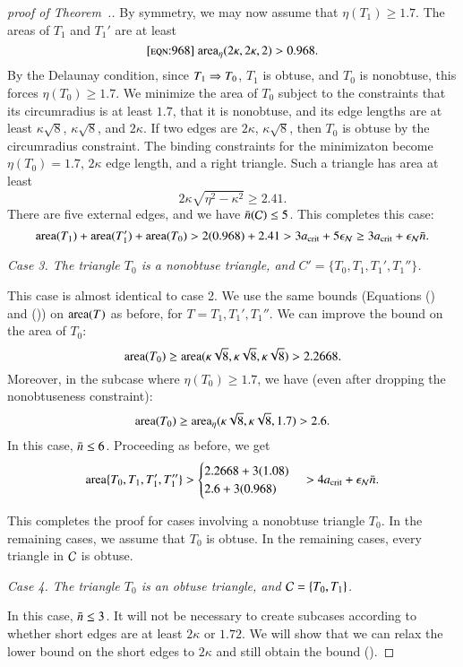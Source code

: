 \begin{proof}[proof of Theorem~.]
By symmetry, we may now assume that $\eta(T_1) \ge 1.7$.  
The areas of $T_1$ and $T_1'$ are at least
\begin{equation}\libel{eqn:968}
\areta(2\kappa,2\kappa,2) > 0.968.
\end{equation}
By the
Delaunay condition, since $T_1\Rightarrow T_0$, $T_1$ is obtuse, and $T_0$ is
nonobtuse, this forces $\eta(T_0)\ge 1.7$.  We minimize the area of
$T_0$ subject to the constraints that its circumradius is at least
$1.7$, that it is nonobtuse, and its edge lengths are at least
$\kappa\sqrt{8}$, $\kappa\sqrt{8}$, and $2\kappa$.  If two edges are
$2\kappa$, $\kappa\sqrt{8}$, then $T_0$ is obtuse by the circumradius
constraint.  The binding constraints for the minimizaton become
$\eta(T_0)=1.7$, $2\kappa$ edge length, and a right triangle.  Such a
triangle has area at least
\[
2\kappa\sqrt{\eta^2 - \kappa^2} \ge 2.41.
\]  
There are five external edges, and we have $\bar n(\mathcal C)\le 5$.
This completes this case:
\[
{\operatorname{area}}(T_1) + {\operatorname{area}}(T_1') + {\operatorname{area}}(T_0) 
>
2(0.968) + 2.41 > 3a_\text{crit} + 5 \epsilon_{\mathcal N} \ge 3a_\text{crit} + \epsilon_{\mathcal N} \bar n.
\] %

{\it Case 3. The triangle $T_0$ is a nonobtuse triangle, and
  $C'=\{T_0,T_1,T_1',T_1''\}$.}

This case is almost identical to case 2.  We use the same bounds
(Equations () and ()) on ${\operatorname{area}}(T)$ as
before, for $T = T_1, T_1', T_1''$.  We can improve the bound on the
area of $T_0$:
\[
{\operatorname{area}}(T_0) 
\ge {\operatorname{area}}(\kappa\sqrt{8},\kappa\sqrt{8},\kappa\sqrt{8}) > 2.2668.
\]
Moreover, in the subcase where $\eta(T_0)\ge 1.7$, we have
(even after dropping the nonobtuseness constraint):
\[
{\operatorname{area}}(T_0) \ge {\operatorname{area}}_\eta(\kappa\sqrt{8},\kappa\sqrt{8},1.7) > 2.6.
\]
In this case, $\bar n\le 6$.  Proceeding as before, we get
\[
{\operatorname{area}}\{T_0,T_1,T_1',T_1''\} > 
\begin{cases}
2.2668 + 3 (1.08) \\
2.6 + 3(0.968)
\end{cases}
> 4a_\text{crit} +  \epsilon_{\mathcal N} \bar n.
\] %


This completes the proof for cases involving a nonobtuse triangle
$T_0$.  In the remaining cases, we assume that $T_0$ is obtuse.  
In the remaining cases, every triangle in $\mathcal C$ is obtuse.

{\it Case 4. The triangle $T_0$ is an obtuse triangle, and $\mathcal C=\{T_0,T_1\}$.}  

In this case, $\bar n\le 3$.  It will not be necessary to create subcases
according to whether short edges are at least $2\kappa$ or $1.72$.  We
will show that we can relax the lower bound on the short edges to $2\kappa$
and still obtain the bound ().


\end{proof}

